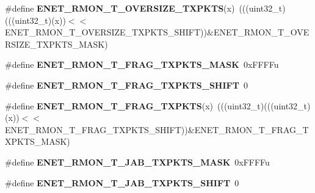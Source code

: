 \begin{DoxyCompactItemize}
\item 
\#define {\bfseries E\+N\+E\+T\+\_\+\+R\+M\+O\+N\+\_\+\+T\+\_\+\+O\+V\+E\+R\+S\+I\+Z\+E\+\_\+\+T\+X\+P\+K\+TS}(x)~(((uint32\+\_\+t)(((uint32\+\_\+t)(x))$<$$<$E\+N\+E\+T\+\_\+\+R\+M\+O\+N\+\_\+\+T\+\_\+\+O\+V\+E\+R\+S\+I\+Z\+E\+\_\+\+T\+X\+P\+K\+T\+S\+\_\+\+S\+H\+I\+FT))\&E\+N\+E\+T\+\_\+\+R\+M\+O\+N\+\_\+\+T\+\_\+\+O\+V\+E\+R\+S\+I\+Z\+E\+\_\+\+T\+X\+P\+K\+T\+S\+\_\+\+M\+A\+SK)\hypertarget{group__ENET__Register__Masks_ga5e08d883d3486d606c248666912ac051}{}\label{group__ENET__Register__Masks_ga5e08d883d3486d606c248666912ac051}

\item 
\#define {\bfseries E\+N\+E\+T\+\_\+\+R\+M\+O\+N\+\_\+\+T\+\_\+\+F\+R\+A\+G\+\_\+\+T\+X\+P\+K\+T\+S\+\_\+\+M\+A\+SK}~0x\+F\+F\+F\+Fu\hypertarget{group__ENET__Register__Masks_ga165675b1bc4ead102b209af312a64e30}{}\label{group__ENET__Register__Masks_ga165675b1bc4ead102b209af312a64e30}

\item 
\#define {\bfseries E\+N\+E\+T\+\_\+\+R\+M\+O\+N\+\_\+\+T\+\_\+\+F\+R\+A\+G\+\_\+\+T\+X\+P\+K\+T\+S\+\_\+\+S\+H\+I\+FT}~0\hypertarget{group__ENET__Register__Masks_gaaab8a0b71f5d34f28a4fc9c1cefd6c21}{}\label{group__ENET__Register__Masks_gaaab8a0b71f5d34f28a4fc9c1cefd6c21}

\item 
\#define {\bfseries E\+N\+E\+T\+\_\+\+R\+M\+O\+N\+\_\+\+T\+\_\+\+F\+R\+A\+G\+\_\+\+T\+X\+P\+K\+TS}(x)~(((uint32\+\_\+t)(((uint32\+\_\+t)(x))$<$$<$E\+N\+E\+T\+\_\+\+R\+M\+O\+N\+\_\+\+T\+\_\+\+F\+R\+A\+G\+\_\+\+T\+X\+P\+K\+T\+S\+\_\+\+S\+H\+I\+FT))\&E\+N\+E\+T\+\_\+\+R\+M\+O\+N\+\_\+\+T\+\_\+\+F\+R\+A\+G\+\_\+\+T\+X\+P\+K\+T\+S\+\_\+\+M\+A\+SK)\hypertarget{group__ENET__Register__Masks_ga010507349cf682b907697293a4302774}{}\label{group__ENET__Register__Masks_ga010507349cf682b907697293a4302774}

\item 
\#define {\bfseries E\+N\+E\+T\+\_\+\+R\+M\+O\+N\+\_\+\+T\+\_\+\+J\+A\+B\+\_\+\+T\+X\+P\+K\+T\+S\+\_\+\+M\+A\+SK}~0x\+F\+F\+F\+Fu\hypertarget{group__ENET__Register__Masks_ga94c366b90093533c7f2149d62fa72133}{}\label{group__ENET__Register__Masks_ga94c366b90093533c7f2149d62fa72133}

\item 
\#define {\bfseries E\+N\+E\+T\+\_\+\+R\+M\+O\+N\+\_\+\+T\+\_\+\+J\+A\+B\+\_\+\+T\+X\+P\+K\+T\+S\+\_\+\+S\+H\+I\+FT}~0\hypertarget{group__ENET__Register__Masks_gac8ba73230f05449d87137e0a0c32d72a}{}\label{group__ENET__Register__Masks_gac8ba73230f05449d87137e0a0c32d72a}


\end{DoxyCompactItemize}
